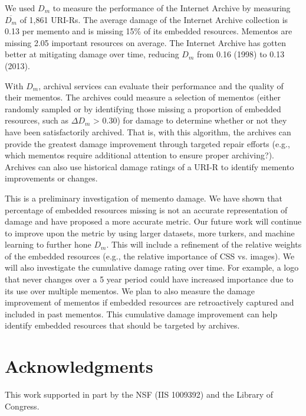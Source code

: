 We used $D_m$ to measure the performance of the Internet Archive by measuring $\overline{D_m}$ of 1,861 URI-Rs. The average damage of the Internet Archive collection is 0.13 per memento and is missing 15\% of its embedded resources. Mementos are missing 2.05 important resources on average. The Internet Archive has gotten better at mitigating damage over time, reducing $D_m$ from 0.16 (1998) to 0.13 (2013). 

With $D_m$, archival services can evaluate their performance and the quality of their mementos. The archives could measure a selection of mementos (either randomly sampled or by identifying those missing a proportion of embedded resources, such as {$\Delta D_m$} > 0.30) for damage to determine whether or not they have been satisfactorily archived. That is, with this algorithm, the archives can provide the greatest damage improvement through targeted repair efforts (e.g., which mementos require additional attention to ensure proper archiving?). Archives can also use historical damage ratings of a URI-R to identify memento improvements or changes.


This is a preliminary investigation of memento damage. We have shown that percentage of embedded resources missing is not an accurate representation of damage and have proposed a more accurate metric.  Our future work will continue to improve upon the metric by using larger datasets, more turkers, and machine learning to further hone $D_m$. This will include a refinement of the relative weights of the embedded resources (e.g., the relative importance of CSS vs. images). We will also investigate the cumulative damage rating over time. For example, a logo that never changes over a 5 year period could have increased importance due to its use over multiple mementos. We plan to also measure the damage improvement of mementos if embedded resources are retroactively captured and included in past mementos. This cumulative damage improvement can help identify embedded resources that should be targeted by archives.


\section{Acknowledgments}
This work supported in part by the NSF (IIS 1009392) and the Library of 
Congress.


%

 
%  







